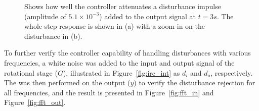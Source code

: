 \begin{figure}[h!]
  \centering %
  \qquad
  \caption{\label{fig:irc_dist_output} Shows how well the controller attenuates a disturbance impulse (amplitude of $5.1 \times 10^{-3}$) added to the output signal at $t=3s$. The whole step response is shown in (a) with a zoom-in on the disturbance in (b).}
\end{figure}
\FloatBarrier
To further verify the controller capability of handling disturbances with various frequencies, a white noise was added to the input and output signal of the rotational stage ($G$), illustrated in Figure~\ref{fig:irc_int} as $d_i$ and $d_o$, respectively. The \abbrFFT was then performed on the output ($y$) to verify the disturbance rejection for all frequencies, and the result is presented in Figure~\ref{fig:fft_in} and Figure~\ref{fig:fft_out}.

